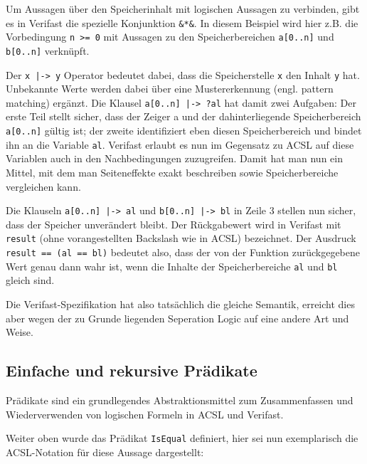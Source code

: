 Um Aussagen über den Speicherinhalt mit logischen Aussagen zu verbinden, gibt es in Verifast die spezielle 
Konjunktion \lstinline{&*&}. In diesem Beispiel wird hier z.B. die Vorbedingung \lstinline{n >= 0} mit Aussagen
zu den Speicherbereichen \lstinline{a[0..n]} und \lstinline{b[0..n]} verknüpft.

Der \lstinline{x |-> y} Operator bedeutet dabei, dass die Speicherstelle \lstinline{x} den Inhalt \lstinline{y} hat.
Unbekannte Werte werden dabei über eine Mustererkennung (engl. pattern matching) ergänzt. Die Klausel
\lstinline{a[0..n] |-> ?al} hat damit zwei Aufgaben: Der erste Teil stellt sicher, dass der Zeiger a und
der dahinterliegende Speicherbereich \lstinline{a[0..n]} gültig ist; der zweite identifiziert eben diesen 
Speicherbereich und bindet ihn an die Variable \lstinline{al}.
Verifast erlaubt es nun im Gegensatz zu ACSL auf diese Variablen auch in den Nachbedingungen zuzugreifen. Damit
hat man nun ein Mittel, mit dem man Seiteneffekte exakt beschreiben sowie Speicherbereiche vergleichen kann.

Die Klauseln \lstinline{a[0..n] |-> al} und \lstinline{b[0..n] |-> bl} in Zeile 3 stellen nun sicher, dass der
Speicher unverändert bleibt. Der Rückgabewert wird in Verifast mit \lstinline{result} (ohne vorangestellten 
Backslash wie in ACSL) bezeichnet. Der Ausdruck \lstinline{result == (al == bl)} bedeutet also, dass der von der Funktion
zurückgegebene Wert genau dann wahr ist, wenn die Inhalte der Speicherbereiche \lstinline{al} und \lstinline{bl} 
gleich sind.

Die Verifast-Spezifikation hat also tatsächlich die gleiche Semantik, erreicht dies aber wegen der zu Grunde
liegenden Seperation Logic auf eine andere Art und Weise.



\subsection{Einfache und rekursive Prädikate}
\label{sec:design-by-contract:predicates}

Prädikate sind ein grundlegendes Abstraktionsmittel zum Zusammenfassen und Wiederverwenden von logischen 
Formeln in ACSL und Verifast.

Weiter oben wurde das Prädikat \lstinline{IsEqual} definiert, hier sei nun exemplarisch die ACSL-Notation
für diese Aussage dargestellt:



